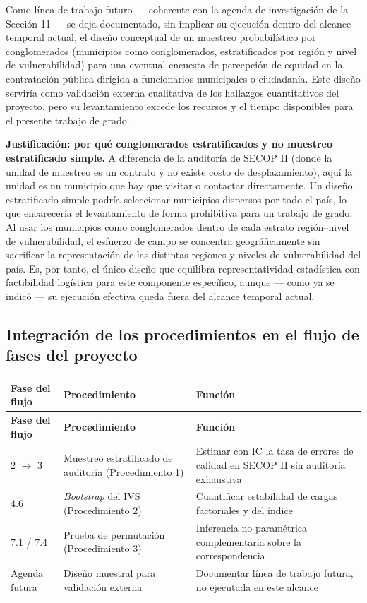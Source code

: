 \documentclass[11pt,letterpaper]{article}
\begin{document}
Como línea de trabajo futuro --- coherente con la agenda de investigación de
la Sección 11 --- se deja documentado, sin implicar su ejecución dentro del
alcance temporal actual, el diseño conceptual de un muestreo probabilístico
por conglomerados (municipios como conglomerados, estratificados por región y
nivel de vulnerabilidad) para una eventual encuesta de percepción de equidad en
la contratación pública dirigida a funcionarios municipales o ciudadanía. Este
diseño serviría como validación externa cualitativa de los hallazgos
cuantitativos del proyecto, pero su levantamiento excede los recursos y el
tiempo disponibles para el presente trabajo de grado.

\textbf{Justificación: por qué conglomerados estratificados y no muestreo
estratificado simple.} A diferencia de la auditoría de SECOP II (donde la
unidad de muestreo es un contrato y no existe costo de desplazamiento), aquí la
unidad es un municipio que hay que visitar o contactar directamente. Un diseño
estratificado simple podría seleccionar municipios dispersos por todo el país,
lo que encarecería el levantamiento de forma prohibitiva para un trabajo de
grado. Al usar los municipios como conglomerados dentro de cada estrato
región--nivel de vulnerabilidad, el esfuerzo de campo se concentra
geográficamente sin sacrificar la representación de las distintas regiones y
niveles de vulnerabilidad del país. Es, por tanto, el único diseño que
equilibra representatividad estadística con factibilidad logística para este
componente específico, aunque --- como ya se indicó --- su ejecución
efectiva queda fuera del alcance temporal actual.

\subsection{Integración de los procedimientos en el flujo de fases del proyecto}

\begin{center}
\small
\begin{longtable}{p{2.4cm}p{4.6cm}p{6.3cm}}
\toprule
\textbf{Fase del flujo} & \textbf{Procedimiento} & \textbf{Función} \\
\midrule
\endfirsthead
\toprule
\textbf{Fase del flujo} & \textbf{Procedimiento} & \textbf{Función} \\
\midrule
\endhead
2 $\rightarrow$ 3 & Muestreo estratificado de auditoría (Procedimiento 1) & Estimar con IC la tasa de errores de calidad en SECOP II sin auditoría exhaustiva \\
4.6 & \textit{Bootstrap} del IVS (Procedimiento 2) & Cuantificar estabilidad de cargas factoriales y del índice \\
7.1 / 7.4 & Prueba de permutación (Procedimiento 3) & Inferencia no paramétrica complementaria sobre la correspondencia \\
Agenda futura & Diseño muestral para validación externa & Documentar línea de trabajo futura, no ejecutada en este alcance \\
\bottomrule
\end{longtable}
\end{center}
\end{document}
